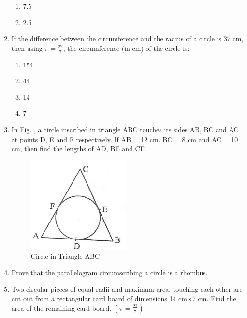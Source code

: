 \documentclass[10pt,-letter paper]{article}
\providecommand{\brak}[1]{\ensuremath{\left(#1\right)}}
\begin{document}
\begin{enumerate}
\begin{enumerate}
    \item 7.5\\
    \item 2.5
 \end{enumerate}
 \item If the difference between the circumference and the radius of a circle is 37 cm, then using $\pi=\frac{22}{7}$, the circumference (in cm) of the circle is:
 \begin{enumerate}
    \item 154\\
    \item 44\\
    \item 14\\
    \item 7
 \end{enumerate}
 \item In Fig. , a circle inscribed in triangle ABC touches its sides AB, BC and AC at points D, E and F respectively. If AB = 12 cm, BC = 8 cm and AC = 10 cm, then find the lengths of AD, BE and CF.
	\begin{figure}[H]
		\centering
\includegraphics[width=\columnwidth]{4.png}
\caption{Circle in Triangle ABC}
\label{fig:fig4}
\end{figure}
\item Prove that the parallelogram circumscribing a circle is a rhombus.
\item Two circular pieces of equal radii and maximum area, touching each other are cut out from a rectangular card board of dimensions 14 cm$\times$7 cm. Find the area of the remaining card board. $\brak{ \pi = \frac{22}{7}}$

\end{enumerate}
\end{document}
